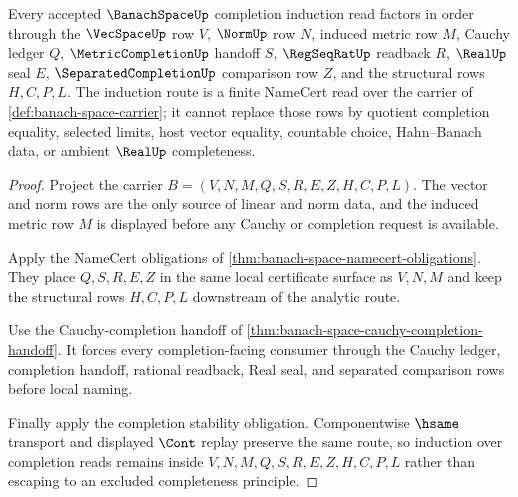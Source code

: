 \begin{theorem}
\label{thm:banach-space-norm-completion-induction-route}
Every accepted $\BanachSpaceUp$ completion induction read factors in order through the $\VecSpaceUp$ row $V$, $\NormUp$ row $N$, induced metric row $M$, Cauchy ledger $Q$, $\MetricCompletionUp$ handoff $S$, $\RegSeqRatUp$ readback $R$, $\RealUp$ seal $E$, $\SeparatedCompletionUp$ comparison row $Z$, and the structural rows $H,C,P,L$. The induction route is a finite NameCert read over the carrier of \autoref{def:banach-space-carrier}; it cannot replace those rows by quotient completion equality, selected limits, host vector equality, countable choice, Hahn--Banach data, or ambient $\RealUp$ completeness.
\end{theorem}
\begin{proof}
Project the carrier $B=(V,N,M,Q,S,R,E,Z,H,C,P,L)$. The vector and norm rows are the only source of linear and norm data, and the induced metric row $M$ is displayed before any Cauchy or completion request is available.

Apply the NameCert obligations of \autoref{thm:banach-space-namecert-obligations}. They place $Q,S,R,E,Z$ in the same local certificate surface as $V,N,M$ and keep the structural rows $H,C,P,L$ downstream of the analytic route.

Use the Cauchy-completion handoff of \autoref{thm:banach-space-cauchy-completion-handoff}. It forces every completion-facing consumer through the Cauchy ledger, completion handoff, rational readback, Real seal, and separated comparison rows before local naming.

Finally apply the completion stability obligation. Componentwise $\hsame$ transport and displayed $\Cont$ replay preserve the same route, so induction over completion reads remains inside $V,N,M,Q,S,R,E,Z,H,C,P,L$ rather than escaping to an excluded completeness principle.
\end{proof}

